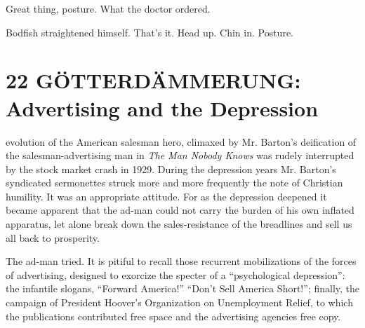 \documentclass[openany,nobib]{tufte-book}
\let\oldchapter\chapter
\def\chapter{%
  \setcounter{footnote}{0}%
  \oldchapter
}
\begin{document}
Great thing, posture. What the doctor ordered.

Bodfish straightened himself. That's it. Head up. Chin in. Posture.




\chapter[22 \hspace*{1mm} G{\"O}TTERD{\"A}MMERUNG]{22 G{\"O}TTERD{\"A}MMERUNG: Advertising and the \newline Depression}

 evolution of the American salesman hero, climaxed by Mr. Barton's
deification of the salesman-advertising man in \emph{The Man Nobody
Knows} was rudely interrupted by the stock market crash in 1929. During
the depression years Mr. Barton's syndicated sermonettes struck more and
more frequently the note of Christian humility. It was an appropriate
attitude. For as the depression deepened it became apparent that the
ad-man could not carry the burden of his own inflated apparatus, let
alone break down the sales-resistance of the breadlines and sell us all
back to prosperity.

The ad-man tried. It is pitiful to recall those recurrent mobilizations
of the forces of advertising, designed to exorcize the specter of a
``psychological depression'': the infantile slogans, ``Forward
America!'' ``Don't Sell America Short!''; finally, the campaign of
President Hoover's Organization on Unemployment Relief, to which the
publications contributed free space and the advertising agencies free
copy.
\end{document}
